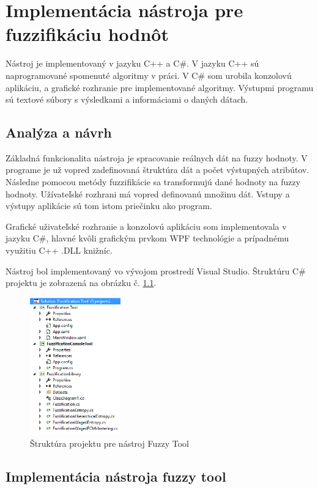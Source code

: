 \chapter{Implementácia nástroja pre fuzzifikáciu hodnôt} 
Nástroj je implementovaný v jazyku C++ a C\#. V jazyku C++ sú naprogramované spomenuté algoritmy v práci. V C\# som urobila konzolovú aplikáciu, a grafické rozhranie pre implementované algoritmy. Výstupmi programu sú textové súbory s výsledkami a informáciami o daných dátach. 

\section{Analýza a návrh}

Základná funkcionalita nástroja je spracovanie reálnych dát na fuzzy hodnoty. 
V programe je už vopred zadefinovaná štruktúra dát a počet výstupných atribútov. Následne pomocou metódy fuzzifikácie sa transformujú dané hodnoty na fuzzy hodnoty.  Užívateľské rozhrani má vopred definovanú množinu dát. Vstupy a výstupy aplikácie sú tom istom priečinku ako program. 

Grafické uživateľské rozhranie a konzolovú aplikáciu som implementovala v jazyku C\#, hlavné kvôli grafickým prvkom WPF technológie a prípadnému využitiu C++ .DLL knižníc. 

Nástroj bol implementovaný vo vývojom prostredí Visual Studio. Štruktúru C\# projektu je zobrazená na obrázku č. \ref{fig:structure}.

\begin{figure}[ht!]
\includegraphics[width=0.35\textwidth]{obrazky/program.PNG}
\centering
\caption{Štruktúra projektu pre nástroj Fuzzy Tool} 
\label{fig:structure}
\end{figure}


\section{Implementácia nástroja fuzzy tool}

